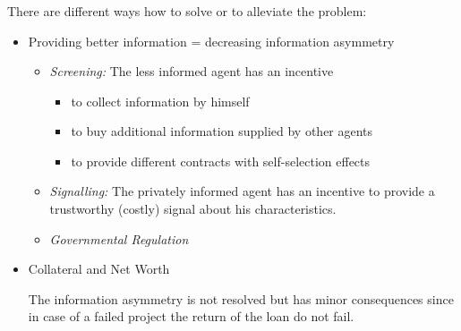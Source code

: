 \documentclass[11pt]{beamer}
\begin{document}

\begin{frame}
\frametitle{\insertsection}

There are different ways how to solve or to alleviate the problem:

\begin{itemize}
\item Providing  better information = decreasing information asymmetry
\begin{itemize}
\item \textit{Screening:} The less informed agent has an incentive
\begin{itemize}
\item     to collect information by himself
\item     to buy additional information supplied by other agents
\item     to provide different contracts with self-selection effects
\end{itemize}
\item \textit{Signalling:} The privately informed agent has an incentive to provide a trustworthy (costly) signal about his characteristics.
\item \textit{Governmental Regulation}
\end{itemize}

\item Collateral and Net Worth
\par\smallskip
  The information asymmetry is not resolved but has minor consequences since in case of a failed project the return of the loan do not fail.
\end{itemize}

\end{frame}

\end{document}
